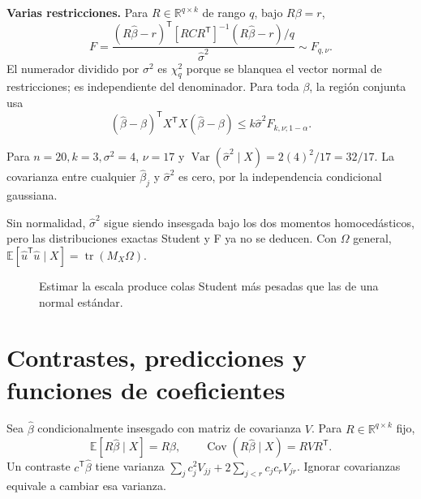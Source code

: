 \documentclass[11pt,a4paper]{article}
\newcommand{\R}{\mathbb R}
\newcommand{\E}{\mathbb E}
\newcommand{\T}{^{\mathsf T}}
\DeclareMathOperator{\Var}{Var}
\DeclareMathOperator{\Cov}{Cov}
\DeclareMathOperator{\tr}{tr}
\newcommand{\Normal}{\mathcal N}
\newcommand{\topic}[2]{\clearpage\section{#1}\label{#2}}
\theoremstyle{definition}\newtheorem{definicion}[teorema]{Definición}
\begin{document}
\textbf{Varias restricciones.}
Para $R\in\R^{q\times k}$ de rango $q$, bajo $R\beta=r$,
\[
F=\frac{(R\widehat\beta-r)\T[RCR\T]^{-1}
(R\widehat\beta-r)/q}{\widehat\sigma^2}
\sim F_{q,\nu}.
\]
El numerador dividido por $\sigma^2$ es $\chi^2_q$ porque se
blanquea el vector normal de restricciones; es independiente del denominador.
Para toda $\beta$, la región conjunta usa
\[
(\widehat\beta-\beta)\T X\T X(\widehat\beta-\beta)
\le k\widehat\sigma^2 F_{k,\nu;1-\alpha}.
\]

\begin{ejemplo}
Para $n=20,k=3,\sigma^2=4$, $\nu=17$ y
$\Var(\widehat\sigma^2\mid X)=2(4)^2/17=32/17$.
La covarianza entre cualquier $\widehat\beta_j$ y $\widehat\sigma^2$
es cero, por la independencia condicional gaussiana.
\end{ejemplo}
Sin normalidad, $\widehat\sigma^2$ sigue siendo insesgada bajo los dos
momentos homocedásticos, pero las distribuciones exactas Student y F
ya no se deducen. Con $\Omega$ general,
$\E[\widehat u\T\widehat u\mid X]=\tr(M_X\Omega)$.

\begin{figure}[H]\centering
{}
\caption{Estimar la escala produce colas Student más pesadas que las de una normal estándar.}
\end{figure}
\topic{Contrastes, predicciones y funciones de coeficientes}{s37}
Sea $\widehat\beta$ condicionalmente insesgado con matriz de covarianza
$V$. Para $R\in\R^{q\times k}$ fijo,
\[
\E[R\widehat\beta\mid X]=R\beta,\qquad
\Cov(R\widehat\beta\mid X)=RVR\T.
\]
Un contraste $c\T\widehat\beta$ tiene varianza
$\sum_jc_j^2V_{jj}+2\sum_{j<r}c_jc_rV_{jr}$.
Ignorar covarianzas equivale a cambiar esa varianza.
\end{document}
